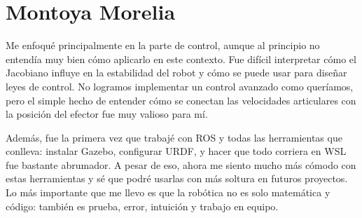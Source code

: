 \section{Montoya Morelia}
Me enfoqué principalmente en la parte de control, aunque al principio no entendía muy bien cómo aplicarlo en este contexto. Fue difícil interpretar cómo el Jacobiano influye en la estabilidad del robot y cómo se puede usar para diseñar leyes de control. No logramos implementar un control avanzado como queríamos, pero el simple hecho de entender cómo se conectan las velocidades articulares con la posición del efector fue muy valioso para mí.

Además, fue la primera vez que trabajé con ROS y todas las herramientas que conlleva: instalar Gazebo, configurar URDF, y hacer que todo corriera en WSL fue bastante abrumador. A pesar de eso, ahora me siento mucho más cómodo con estas herramientas y sé que podré usarlas con más soltura en futuros proyectos. Lo más importante que me llevo es que la robótica no es solo matemática y código: también es prueba, error, intuición y trabajo en equipo.

